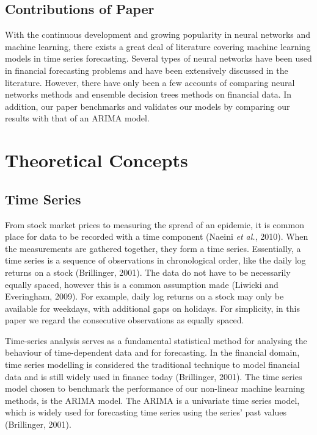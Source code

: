 \subsection{Contributions of Paper}

With the continuous development and growing popularity in neural networks and machine learning, there exists a great deal of literature covering machine learning models in time series forecasting. Several types of neural networks have been used in financial forecasting problems and have been extensively discussed in the literature. However, there have only been a few accounts of comparing neural networks methods and ensemble decision trees methods on financial data. In addition, our paper benchmarks and validates our models by comparing our results with  that of an ARIMA model. 

\section{Theoretical Concepts}

\subsection{Time Series}

From stock market prices to measuring the spread of an epidemic, it is common place for data to be recorded with a time component (Naeini \textit{et al.}, 2010). When the measurements are gathered together, they form a time series. Essentially, a time series is a sequence of observations in chronological order, like the daily log returns on a stock  (Brillinger, 2001). The data do not have to be necessarily equally spaced, however this is a common assumption made (Liwicki and Everingham, 2009). For example, daily log returns on a stock may only be available for weekdays, with additional gaps on holidays. For simplicity, in this paper we regard the consecutive observations as equally spaced. 


Time-series analysis serves as a fundamental statistical method for analysing the behaviour of time-dependent data and for forecasting. In the financial domain, time series modelling is considered the traditional technique to model financial data and is still widely used in finance today (Brillinger, 2001). The time series model chosen to benchmark the performance of our non-linear machine learning methods, is the ARIMA model. The ARIMA is a univariate time series model, which is widely used for forecasting time series using the series’ past values (Brillinger, 2001). 

